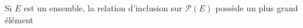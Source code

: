 Si $E$ est un ensemble, la relation d'inclusion sur $\mathcal P(E)$ possède un plus grand élément

\begin{reponses}
\end{reponses}

